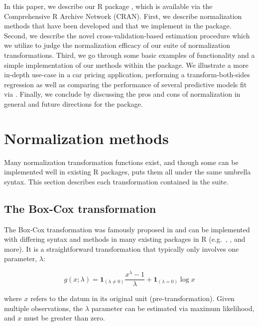 In this paper, we describe our R package , which is
available via the Comprehensive R Archive Network (CRAN). First, we
describe normalization methods that have been developed and that we
implement in the package. Second, we describe the novel
cross-validation-based estimation procedure which we utilize to judge
the normalization efficacy of our suite of normalization
transformations. Third, we go through some basic examples of
 functionality and a simple implementation of our
methods within the  package. We illustrate a more in-depth
use-case in a car pricing application, performing a transform-both-sides
regression as well as comparing the performance of several predictive
models fit via . Finally, we conclude by discussing the pros
and cons of normalization in general and future directions for the
package.

\hypertarget{normalization-methods}{%
\section{Normalization methods}\label{normalization-methods}}

Many normalization transformation functions exist, and though some can
be implemented well in existing R packages,  puts
them all under the same umbrella syntax. This section describes each
transformation contained in the  suite.

\hypertarget{the-box-cox-transformation}{%
\subsection{The Box-Cox
transformation}\label{the-box-cox-transformation}}

The Box-Cox transformation was famously proposed in \citet{BoxCox1964}
and can be implemented with differing syntax and methods in many
existing packages in R (e.g.~,  \citep{MASS},
and more). It is a straightforward transformation that typically only
involves one parameter, \(\lambda\):

\[
g(x; \lambda) = \boldsymbol 1 _{(\lambda \neq 0)} \frac{x^\lambda-1}{\lambda} 
+ \boldsymbol 1_{(\lambda = 0)} \log x
\]

\noindent where \(x\) refers to the datum in its original unit
(pre-transformation). Given multiple observations, the \(\lambda\)
parameter can be estimated via maximum likelihood, and \(x\) must be
greater than zero.

